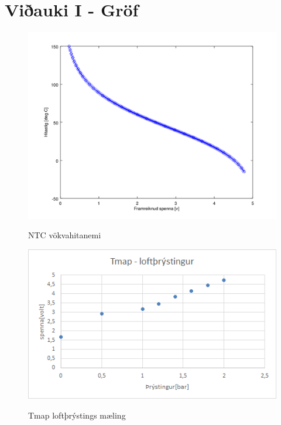 \documentclass[paper=a4, fontsize=11pt]{scrartcl}
\numberwithin{equation}{section}		%
\numberwithin{figure}{section}			%
\numberwithin{table}{section}				%
\begin{document}
\section{Viðauki I - Gröf}

\begin{figure}
	\begin{center}
		\includegraphics[scale=0.9]{NTC.png}\\
		\caption{NTC vökvahitanemi}
	\end{center}
\end{figure}
\begin{figure}
	\begin{center}
		\includegraphics[]{airpress.png}\\
        \caption{Tmap loftþrýstings mæling}
	\end{center}
\end{figure}
\end{document}
